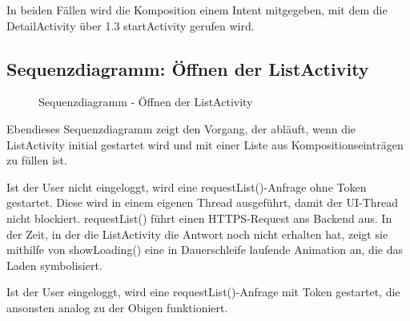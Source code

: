 In beiden Fällen wird die Komposition einem Intent mitgegeben, mit dem die DetailActivity über 1.3 startActivity gerufen wird.


\subsection*{Sequenzdiagramm: Öffnen der ListActivity}

\begin{figure}[h]
	\centering
	\caption{Sequenzdiagramm - Öffnen der ListActivity}
	\label{fig:sequenz-a}
\end{figure}

Ebendieses Sequenzdiagramm zeigt den Vorgang, der abläuft, wenn die ListActivity initial gestartet wird und mit einer Liste aus Kompositionseinträgen zu füllen ist.

Ist der User nicht eingeloggt, wird eine requestList()-Anfrage ohne Token gestartet. Diese wird in einem eigenen Thread ausgeführt, damit der UI-Thread nicht blockiert. requestList() führt einen HTTPS-Request ans Backend aus. In der Zeit, in der die ListActivity die Antwort noch nicht erhalten hat, zeigt sie mithilfe von showLoading() eine in Dauerschleife laufende Animation an, die das Laden symbolisiert.

Ist der User eingeloggt, wird eine requestList()-Anfrage mit Token gestartet, die ansonsten analog zu der Obigen funktioniert.
